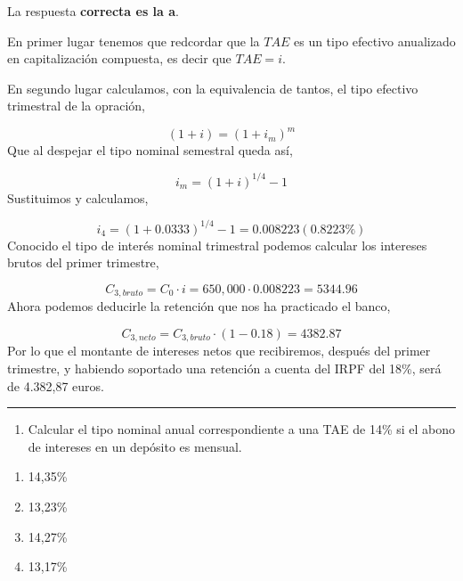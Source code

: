 \documentclass[
  letterpaper,
  DIV=11,
  numbers=noendperiod]{scrreprt}
\providecommand{\tightlist}{%
  \setlength{\itemsep}{0pt}\setlength{\parskip}{0pt}}\usepackage{longtable,booktabs,array}
\begin{document}
\begin{tcolorbox}[enhanced jigsaw, left=2mm, opacityback=0, colback=white, breakable, arc=.35mm, bottomrule=.15mm, rightrule=.15mm, toprule=.15mm, leftrule=.75mm, colframe=quarto-callout-tip-color-frame]
\begin{minipage}[t]{5.5mm}
\textcolor{quarto-callout-tip-color}{\faLightbulb}
\end{minipage}%
\begin{minipage}[t]{\textwidth - 5.5mm}

La respuesta \textbf{correcta es la a}.

En primer lugar tenemos que redcordar que la \(TAE\) es un tipo efectivo
anualizado en capitalización compuesta, es decir que \(TAE=i\).

En segundo lugar calculamos, con la equivalencia de tantos, el tipo
efectivo trimestral de la opración,

\[(1+i)=(1+ i _m)^m\] Que al despejar el tipo nominal semestral queda
así,

\[i _m=(1+i)^{1/4}-1\] Sustituimos y calculamos,

\[i _4=(1+0.0333)^{1/4}-1=0.008223(0.8223\%)\] Conocido el tipo de
interés nominal trimestral podemos calcular los intereses brutos del
primer trimestre,

\[C_{3,bruto}=C_0\cdot i=650,000\cdot0.008223=5344.96\] Ahora podemos
deducirle la retención que nos ha practicado el banco,

\[C_{3,neto}=C_{3,bruto}\cdot (1-0.18)=4382.87\] Por lo que el montante
de intereses netos que recibiremos, después del primer trimestre, y
habiendo soportado una retención a cuenta del IRPF del 18\%, será de
4.382,87 euros.

\end{minipage}%
\end{tcolorbox}

\begin{center}\rule{0.5\linewidth}{0.5pt}\end{center}

\begin{enumerate}
\def\labelenumi{\arabic{enumi}.}
\setcounter{enumi}{16}
\tightlist
\item
  Calcular el tipo nominal anual correspondiente a una TAE de 14\% si el
  abono de intereses en un depósito es mensual.
\end{enumerate}

\begin{enumerate}
\def\labelenumi{\alph{enumi})}
\item
  14,35\%
\item
  13,23\%
\item
  14,27\%
\item
  13,17\%
\end{enumerate}
\end{document}

